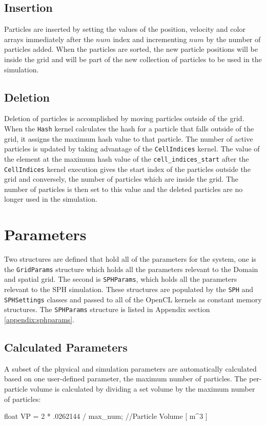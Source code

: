 \subsection{Insertion}
Particles are inserted by setting the values of the position, velocity and
color arrays immediately after the $num$ index and incrementing $num$ by the
number of particles added. When the particles are sorted, the new particle
positions will be inside the grid and will be part of the new collection of
particles to be used in the simulation.

\subsection{Deletion}
Deletion of particles is accomplished by moving particles outside of the grid.
When the \verb|Hash| kernel calculates the hash for a particle that falls
outside of the grid, it assigns the maximum hash value to that particle.
The number of active particles is updated by taking advantage of the
\verb|CellIndices| kernel. The value of the element at the maximum hash value
of the \verb|cell_indices_start| after the \verb|CellIndices| kernel execution
gives the start index of the particles outside the grid and conversely, the
number of particles which are inside the grid. The number of particles is then
set to this value and the deleted particles are no longer used in the
simulation.

\section{Parameters}
Two structures are defined that hold all of the parameters for the system,
one is the \verb|GridParams| structure which holds all the parameters relevant
to the Domain and spatial grid. The second is \verb|SPHParams|, which holds
all the parameters relevant to the SPH simulation. These structures are
populated by the \verb|SPH| and \verb|SPHSettings| classes and passed to all of
the OpenCL kernels as constant memory structures. The \verb|SPHParams|
structure is listed in Appendix section \ref{appendix:sphparams}.


\subsection{Calculated Parameters}
A subset of the physical and simulation parameters are automatically calculated
based on one user-defined parameter, the maximum number of particles. The
per-particle volume is calculated by dividing a set volume by the maximum
number of particles:
\begin{cppcode}{0}
float VP = 2 * .0262144 / max_num;              //Particle Volume [ m^3 ]
\end{cppcode}


